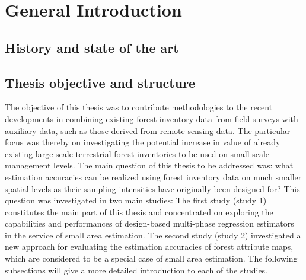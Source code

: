 	
			
	

	
\chapter{General Introduction}
\label{chap:intro}
\newpage

\section{History and state of the art}
\label{sec:intro:hist_soa}



\newpage
\section{Thesis objective and structure}
\label{sec:intro:obj_and_struct}

The objective of this thesis was to contribute methodologies to the recent developments in combining existing forest inventory data from field surveys with auxiliary data, such as those derived from remote sensing data. The particular focus was thereby on investigating the potential increase in value of already existing large scale terrestrial forest inventories to be used on small-scale management levels. The main question of this thesis to be addressed was: what estimation accuracies can be realized using forest inventory data on much smaller spatial levels as their sampling intensities have originally been designed for? This question was investigated in two main studies: The first study (study 1) constitutes the main part of this thesis and concentrated on exploring the capabilities and performances of design-based multi-phase regression estimators in the service of small area estimation. The second study (study 2) investigated a new approach for evaluating the estimation accuracies of forest attribute maps, which are considered to be a special case of small area estimation. The following subsections will give a more detailed introduction to each of the studies.


